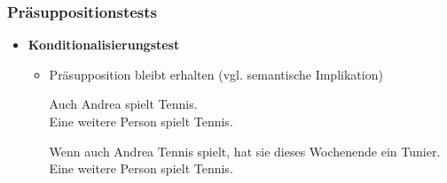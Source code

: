 \begin{frame}
\frametitle{Präsuppositionstests}

\begin{itemize}
\item \textbf{Konditionalisierungstest}

\vspace{5mm}

	\begin{itemize}
		\item Präsupposition bleibt erhalten (vgl. semantische Implikation)
		
		\ea Auch Andrea spielt Tennis.\\ \prspp Eine weitere Person spielt Tennis.
		\z
		
		\ea Wenn auch Andrea Tennis spielt, hat sie dieses Wochenende ein Tunier.\\ \prspp Eine weitere Person spielt Tennis.
		\z
		
%

	\end{itemize}
	
\end{itemize}

\end{frame}



%
%	
%	
%	
%		
%
%


